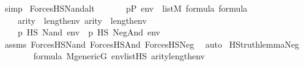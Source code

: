 \begin{isabellebody}
\ simp\isanewline
{}\isamarkupfalse%
%
\endisatagproof
{\isafoldproof}%
%
\isadelimproof
\isanewline
%
\endisadelimproof
\isanewline
{}\isamarkupfalse%
\ ForcesHS{\isacharunderscore}{\kern0pt}Nand{\isacharunderscore}{\kern0pt}alt{\isacharcolon}{\kern0pt}\isanewline
\ \ \isanewline
\ \ \ \ {\isachardoublequoteopen}p{\isasymin}P{\isachardoublequoteclose}\ {\isachardoublequoteopen}env\ {\isasymin}\ list{\isacharparenleft}{\kern0pt}M{\isacharparenright}{\kern0pt}{\isachardoublequoteclose}\ {\isachardoublequoteopen}{\isasymphi}{\isasymin}formula{\isachardoublequoteclose}\ {\isachardoublequoteopen}{\isasympsi}{\isasymin}formula{\isachardoublequoteclose}\ \isanewline
\ \ \ \ {\isachardoublequoteopen}arity{\isacharparenleft}{\kern0pt}{\isasymphi}{\isacharparenright}{\kern0pt}\ {\isasymle}\ length{\isacharparenleft}{\kern0pt}env{\isacharparenright}{\kern0pt}{\isachardoublequoteclose}\ {\isachardoublequoteopen}arity{\isacharparenleft}{\kern0pt}{\isasympsi}{\isacharparenright}{\kern0pt}\ {\isasymle}\ length{\isacharparenleft}{\kern0pt}env{\isacharparenright}{\kern0pt}{\isachardoublequoteclose}\isanewline
\ \ \isanewline
\ \ \ \ {\isachardoublequoteopen}{\isacharparenleft}{\kern0pt}p\ {\isasymtturnstile}HS\ Nand{\isacharparenleft}{\kern0pt}{\isasymphi}{\isacharcomma}{\kern0pt}{\isasympsi}{\isacharparenright}{\kern0pt}\ env{\isacharparenright}{\kern0pt}\ {\isasymlongleftrightarrow}\ {\isacharparenleft}{\kern0pt}p\ {\isasymtturnstile}HS\ Neg{\isacharparenleft}{\kern0pt}And{\isacharparenleft}{\kern0pt}{\isasymphi}{\isacharcomma}{\kern0pt}{\isasympsi}{\isacharparenright}{\kern0pt}{\isacharparenright}{\kern0pt}\ env{\isacharparenright}{\kern0pt}{\isachardoublequoteclose}\isanewline
%
\isadelimproof
\ \ %
\endisadelimproof
%
\isatagproof
{}\isamarkupfalse%
\ assms\ ForcesHS{\isacharunderscore}{\kern0pt}Nand\ ForcesHS{\isacharunderscore}{\kern0pt}And\ ForcesHS{\isacharunderscore}{\kern0pt}Neg\ \isamarkupfalse%
\ auto%
\endisatagproof
{\isafoldproof}%
%
\isadelimproof
\isanewline
%
\endisadelimproof
\isanewline
{}\isamarkupfalse%
\ HS{\isacharunderscore}{\kern0pt}truth{\isacharunderscore}{\kern0pt}lemma{\isacharunderscore}{\kern0pt}Neg{\isacharcolon}{\kern0pt}\isanewline
\ \ \ \isanewline
\ \ \ \ {\isachardoublequoteopen}{\isasymphi}{\isasymin}formula{\isachardoublequoteclose}\ {\isachardoublequoteopen}M{\isacharunderscore}{\kern0pt}generic{\isacharparenleft}{\kern0pt}G{\isacharparenright}{\kern0pt}{\isachardoublequoteclose}\ {\isachardoublequoteopen}env{\isasymin}list{\isacharparenleft}{\kern0pt}HS{\isacharparenright}{\kern0pt}{\isachardoublequoteclose}\ {\isachardoublequoteopen}arity{\isacharparenleft}{\kern0pt}{\isasymphi}{\isacharparenright}{\kern0pt}{\isasymle}length{\isacharparenleft}{\kern0pt}env{\isacharparenright}{\kern0pt}{\isachardoublequoteclose}\ \isanewline

\end{isabellebody}

